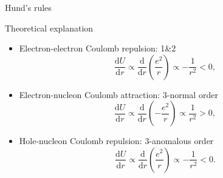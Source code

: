\begin{frame}{Hund's rules}
    \begin{block}{Theoretical explanation}
        \begin{itemize}
            \item<1-> Electron-electron Coulomb repulsion: 1\&2
            \begin{equation*}
                \frac{\mathrm{d}U}{\mathrm{d}r}\propto\frac{\mathrm{d}}{\mathrm{d}r}\left(\frac{e^2}{r}\right)\propto-\frac{1}{r^2}<0,
            \end{equation*}
            \item<2-> Electron-nucleon Coulomb attraction: 3-normal order
            \begin{equation*}
                \frac{\mathrm{d}U}{\mathrm{d}r}\propto\frac{\mathrm{d}}{\mathrm{d}r}\left(-\frac{e^2}{r}\right)\propto\frac{1}{r^2}>0,
            \end{equation*}
            \item<3-> Hole-nucleon Coulomb repulsion: 3-anomalous order
            \begin{equation*}
                \frac{\mathrm{d}U}{\mathrm{d}r}\propto\frac{\mathrm{d}}{\mathrm{d}r}\left(\frac{e^2}{r}\right)\propto-\frac{1}{r^2}<0.
            \end{equation*}
        \end{itemize}
    \end{block}
\end{frame}